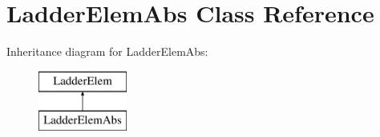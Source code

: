 \hypertarget{class_ladder_elem_abs}{\section{Ladder\-Elem\-Abs Class Reference}
\label{class_ladder_elem_abs}
}
Inheritance diagram for Ladder\-Elem\-Abs\-:\begin{figure}[H]
\begin{center}
\leavevmode
\includegraphics[height=2.000000cm]{class_ladder_elem_abs}
\end{center}
\end{figure}
